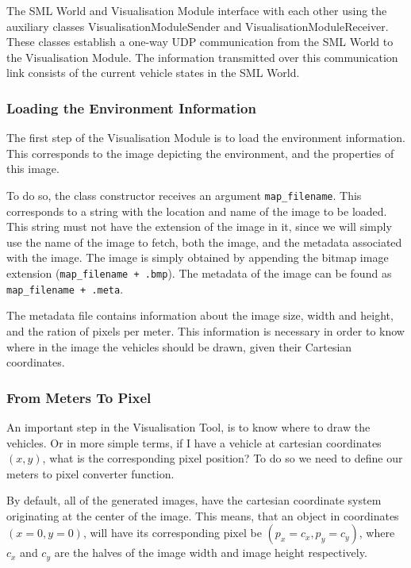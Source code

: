 The SML World and Visualisation Module interface with each other using the auxiliary classes VisualisationModuleSender and VisualisationModuleReceiver. These classes establish a one-way UDP communication from the SML World to the Visualisation Module. The information transmitted over this communication link consists of the current vehicle states in the SML World.

\subsubsection{Loading the Environment Information}

The first step of the Visualisation Module is to load the environment information. This corresponds to the image depicting the environment, and the properties of this image.

To do so, the class constructor receives an argument \texttt{map\_filename}. This corresponds to a string with the location and name of the image to be loaded. This string must not have the extension of the image in it, since we will simply use the name of the image to fetch, both the image, and the metadata associated with the image. The image is simply obtained by appending the bitmap image extension (\texttt{map\_filename + .bmp}). The metadata of the image can be found as \texttt{map\_filename + .meta}.

The metadata file contains information about the image size, width and height, and the ration of pixels per meter. This information is necessary in order to know where in the image the vehicles should be drawn, given their Cartesian coordinates.

\subsubsection{From Meters To Pixel}

An important step in the Visualisation Tool, is to know where to draw the vehicles. Or in more simple terms, if I have a vehicle at cartesian coordinates $(x, y)$, what is the corresponding pixel position? To do so we need to define our meters to pixel converter function.

By default, all of the generated images, have the cartesian coordinate system originating at the center of the image. This means, that an object in coordinates $(x = 0, y = 0)$, will have its corresponding pixel be $(p_x = c_x, p_y = c_y)$, where $c_x$ and $c_y$ are the halves of the image width and image height respectively.

